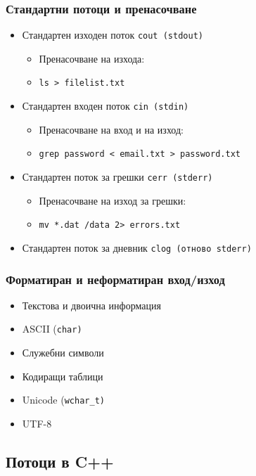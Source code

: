\documentclass{beamer}
\begin{document}
\begin{frame}
  \frametitle{Стандартни потоци и пренасочване}

  \begin{itemize}
  \item Стандартен изходен поток \tt{cout} (\tt{stdout})
    \begin{itemize}
    \item Пренасочване на изхода:
    \item \tt{ls  > filelist.txt}
    \end{itemize}
  \item Стандартен входен поток \tt{cin} (\tt{stdin})
    \begin{itemize}
    \item Пренасочване на вход и на изход:
    \item \tt{grep password < email.txt > password.txt}
    \end{itemize}
  \item Стандартен поток за грешки \tt{cerr} (\tt{stderr})
    \begin{itemize}
    \item Пренасочване на изход за грешки:
    \item \tt{mv *.dat /data 2> errors.txt}
    \end{itemize}
  \item Стандартен поток за дневник \tt{clog} (отново \tt{stderr})    
  \end{itemize}
\end{frame}

\begin{frame}
  \frametitle{Форматиран и неформатиран вход/изход}

  \begin{itemize}
  \item Текстова и двоична информация
  \item ASCII (\tt{char})
  \item Служебни символи
  \item Кодиращи таблици
  \item Unicode (\tt{wchar\_t})
  \item UTF-8
  \end{itemize}
\end{frame}

\subsection{Потоци в C++}
\end{document}
